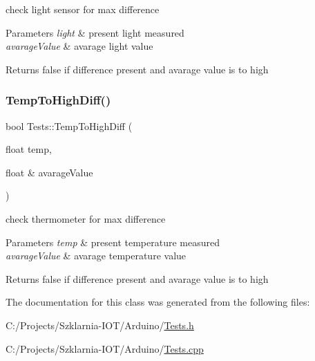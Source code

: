 check light sensor for max difference 


\begin{DoxyParams}{Parameters}
{\em light} & present light measured \\
\hline
{\em avarage\+Value} & avarage light value \\
\hline
\end{DoxyParams}
\begin{DoxyReturn}{Returns}
false if difference present and avarage value is to high 
\end{DoxyReturn}
\mbox{\label{class_tests_aaa57adb084c84b341dcdaee8bf13565a}} 
\subsubsection{\texorpdfstring{Temp\+To\+High\+Diff()}{TempToHighDiff()}}
{\footnotesize\ttfamily bool Tests\+::\+Temp\+To\+High\+Diff (\begin{DoxyParamCaption}\item[{float}]{temp,  }\item[{float \&}]{avarage\+Value }\end{DoxyParamCaption})}



check thermometer for max difference 


\begin{DoxyParams}{Parameters}
{\em temp} & present temperature measured \\
\hline
{\em avarage\+Value} & avarage temperature value \\
\hline
\end{DoxyParams}
\begin{DoxyReturn}{Returns}
false if difference present and avarage value is to high 
\end{DoxyReturn}


The documentation for this class was generated from the following files\+:\begin{DoxyCompactItemize}
\item 
C\+:/\+Projects/\+Szklarnia-\/\+I\+O\+T/\+Arduino/\hyperlink{_tests_8h}{Tests.\+h}\item 
C\+:/\+Projects/\+Szklarnia-\/\+I\+O\+T/\+Arduino/\hyperlink{_tests_8cpp}{Tests.\+cpp}\end{DoxyCompactItemize}
